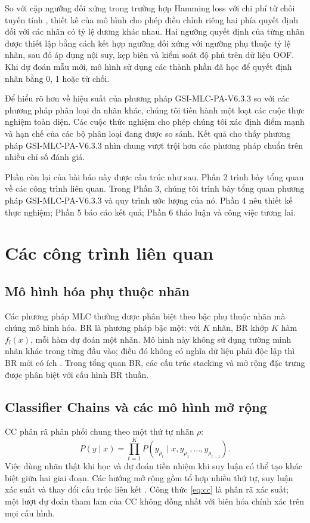 \documentclass[11pt,a4paper]{article}
\begin{document}
So với cặp ngưỡng đối xứng trong trường hợp Hamming loss với chi phí từ chối tuyến tính \cite{nguyen2020,nguyen2021}, thiết kế của mô hình cho phép điều chỉnh riêng hai phía quyết định đối với các nhãn có tỷ lệ dương khác nhau. Hai ngưỡng quyết định của từng nhãn được thiết lập bằng cách kết hợp ngưỡng đối xứng với ngưỡng phụ thuộc tỷ lệ nhãn, sau đó áp dụng nội suy, kẹp biên và kiểm soát độ phủ trên dữ liệu OOF. Khi dự đoán mẫu mới, mô hình sử dụng các thành phần đã học để quyết định nhãn bằng 0, 1 hoặc từ chối.

Để hiểu rõ hơn về hiệu suất của phương pháp GSI-MLC-PA-V6.3.3 so với các phương pháp phân loại đa nhãn khác, chúng tôi tiến hành một loạt các cuộc thực nghiệm toàn diện. Các cuộc thức nghiệm cho phép chúng tôi xác định điểm mạnh và hạn chế của các bộ phân loại đang được so sánh. Kết quả cho thấy phương pháp GSI-MLC-PA-V6.3.3 nhìn chung vượt trội hơn các phương pháp chuẩn trên nhiều chỉ số đánh giá.

Phần còn lại của bài báo này được cấu trúc như sau. Phần 2 trình bày tổng quan về các công trình liên quan. Trong Phần 3, chúng tôi trình bày tổng quan phương pháp GSI-MLC-PA-V6.3.3 và quy trình ước lượng của nó. Phần 4 nêu thiết kế thực nghiệm; Phần 5 báo cáo kết quả; Phần 6 thảo luận và công việc tương lai.

\section{Các công trình liên quan}
\subsection{Mô hình hóa phụ thuộc nhãn}
Các phương pháp MLC thường được phân biệt theo bậc phụ thuộc nhãn mà chúng mô hình hóa. BR là phương pháp bậc một: với $K$ nhãn, BR khớp $K$ hàm $f_l(x)$, mỗi hàm dự đoán một nhãn. Mô hình này không sử dụng tường minh nhãn khác trong từng đầu vào; điều đó không có nghĩa dữ liệu phải độc lập thì BR mới có ích \cite{br2018,cc2021}. Trong tổng quan BR, các cấu trúc stacking và mở rộng đặc trưng được phân biệt với cấu hình BR thuần.

\subsection{Classifier Chains và các mô hình mở rộng}
CC phân rã phân phối chung theo một thứ tự nhãn $\rho$:
\begin{equation}
 P(y\mid x)=\prod_{t=1}^{K}P(y_{\rho_t}\mid x,y_{\rho_1},\ldots,y_{\rho_{t-1}}).
 \label{eq:cc}
\end{equation}
Việc dùng nhãn thật khi học và dự đoán tiền nhiệm khi suy luận có thể tạo khác biệt giữa hai giai đoạn. Các hướng mở rộng gồm tổ hợp nhiều thứ tự, suy luận xác suất và thay đổi cấu trúc liên kết \cite{cc2011,cc2021}. Công thức \eqref{eq:cc} là phân rã xác suất; một lượt dự đoán tham lam của CC không đồng nhất với biên hóa chính xác trên mọi cấu hình.
\end{document}
